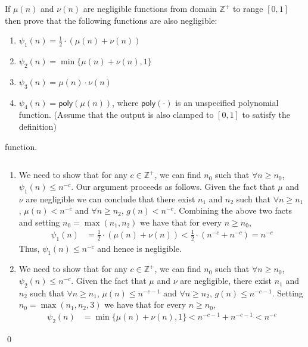 \begin{exercise}
If $\mu(n)$ and $\nu(n)$ are negligible functions from domain $\mathbb{Z}^+$ to range $[0,1]$ then prove that the following functions are also negligible:
\begin{enumerate}
    \item $\psi_1(n) = \frac{1}{2} \cdot \left(\mu(n) + \nu(n)\right)$
    \item $\psi_2(n) = \min\{\mu(n) + \nu(n), 1\}$
    \item $\psi_3(n) = \mu(n)\cdot \nu(n)$
    \item $\psi_4(n) = \mathsf{poly}(\mu(n))$, where $\mathsf{poly}(\cdot)$ is an unspecified polynomial function. (Assume that the output is also clamped to $[0,1]$ to satisfy the definition)
\end{enumerate}function.
\end{exercise}
\proof 
$ $
\begin{enumerate}
    \item We need to show that for any $c \in \mathbb{Z}^+$, we can find $n_0$ such that $\forall n \geq n_0$, $\psi_1(n) \leq n^{-c}$. Our argument proceeds as follows. Given the fact that $\mu$ and $\nu$ are negligible we can conclude that there exist $n_1$ and $n_2$ such that $\forall n \geq n_1$, $\mu(n) < n^{-c}$ and $\forall n \geq n_2$, $g(n) < n^{-c}$. Combining the above two facts and setting $n_0 = \max(n_1, n_2)$ we have that for every $n \geq n_0$,
    \begin{align*}
        \psi_1(n) &= \frac{1}{2} \cdot (\mu(n) + \nu(n)) < \frac{1}{2} \cdot (n^{-c} + n^{-c}) = n^{-c}
    \end{align*}
    Thus, $\psi_1(n) \leq n^{-c}$ and hence is negligible.

    \item We need to show that for any $c \in \mathbb{Z}^+$, we can find $n_0$ such that $\forall n \geq n_0$, $\psi_2(n) \leq n^{-c}$. Given the fact that $\mu$ and $\nu$ are negligible, there exist $n_1$ and $n_2$ such that $\forall n \geq n_1$, $\mu(n) \leq n^{-c-1}$ and $\forall n \geq n_2$, $g(n) \leq n^{-c-1}$. Setting $n_0 = \max(n_1, n_2, 3)$ we have that for every $n \geq n_0$,
    \begin{align*}
        \psi_2(n) &= \min\{\mu(n) + \nu(n), 1\} < n^{-c-1} + n^{-c-1} < n^{-c}
    \end{align*}
\end{enumerate}
\qed

%

